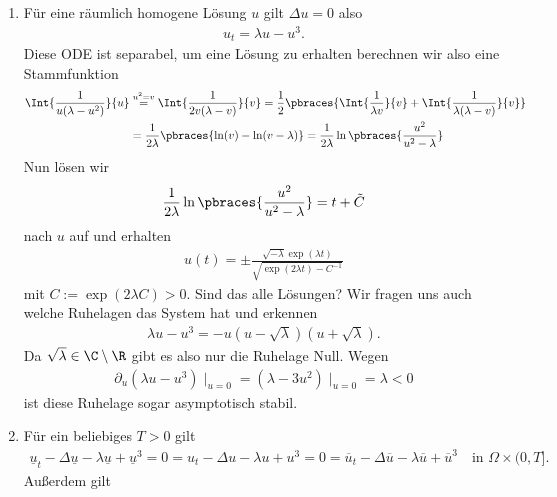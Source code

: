 \begin{solution}

\phantom{}
	\begin{enumerate}[label = (\roman*)]
		\item Für eine räumlich homogene Lösung $u$ gilt $\Delta u = 0$ also 
		\begin{align*}
			u_t = \lambda u - u^3.
		\end{align*}
		Diese ODE ist separabel, um eine Lösung zu erhalten berechnen wir also eine Stammfunktion
		\begin{align*}
			\Int{\frac{1}{u(\lambda - u^2)}}{u} &\stackrel{u^2 = v}{=} \Int{\frac{1}{2 v(\lambda - v)}}{v} = \frac{1}{2} \pbraces{\Int{\frac{1}{\lambda v}}{v} + \Int{\frac{1}{\lambda (\lambda - v)}}{v}} \\
			 &= \frac{1}{2\lambda} \pbraces{\ln(v) - \ln(v - \lambda)} = \frac{1}{2 \lambda} \ln\pbraces{\frac{u^2}{u^2 - \lambda}} 
		\end{align*}
		Nun lösen wir 
		\begin{align*}
			\frac{1}{2 \lambda} \ln\pbraces{\frac{u^2}{u^2 - \lambda}} = t + \tilde{C}
		\end{align*}
		nach $u$ auf und erhalten
		\begin{align*}
			u(t) = \pm \frac{\sqrt{- \lambda} \exp(\lambda t)}{\sqrt{\exp(2\lambda t) - C^{-1}}}
		\end{align*}
		mit $C := \exp (2 \lambda C) > 0$. Sind das alle Lösungen? \newline
		Wir fragen uns auch welche Ruhelagen das System hat und erkennen 
		\begin{align*}
			\lambda u - u^3 = - u (u - \sqrt{\lambda}) (u + \sqrt{\lambda}).
		\end{align*}
		Da $\sqrt{\lambda} \in \C \setminus \R$ gibt es also nur die Ruhelage Null. Wegen \begin{align*}
			\partial_u (\lambda u - u^3)\mid_{u = 0} = (\lambda - 3 u^2)\mid_{u = 0} = \lambda < 0
		\end{align*}
		ist diese Ruhelage sogar asymptotisch stabil. 
		\item Für ein beliebiges $T > 0$ gilt 
		\begin{align*}
			\underline{u}_t - \Delta \underline{u} - \lambda \underline{u} + \underline{u}^3 = 0 = u_t - \Delta u - \lambda u + u^3 = 0 = \overline{u}_t - \Delta \overline{u} - \lambda \overline{u} + \overline{u}^3 \quad \text{in } \Omega \times (0, T].
		\end{align*}
		Außerdem gilt 
		\begin{align*}

\end{align*}
\end{enumerate}
\end{solution}
